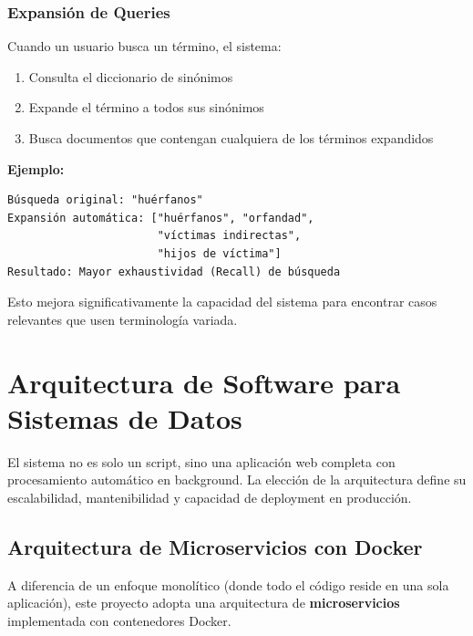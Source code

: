 \subsubsection{Expansión de Queries}
\label{subsubsec:expansion_queries}

Cuando un usuario busca un término, el sistema:
\begin{enumerate}
    \item Consulta el diccionario de sinónimos
    \item Expande el término a todos sus sinónimos
    \item Busca documentos que contengan cualquiera de los términos expandidos
\end{enumerate}

\textbf{Ejemplo:}
\begin{verbatim}
Búsqueda original: "huérfanos"
Expansión automática: ["huérfanos", "orfandad", 
                       "víctimas indirectas", 
                       "hijos de víctima"]
Resultado: Mayor exhaustividad (Recall) de búsqueda
\end{verbatim}

Esto mejora significativamente la capacidad del sistema para encontrar casos relevantes que usen terminología variada.

\section{Arquitectura de Software para Sistemas de Datos}
\label{sec:mt_arquitectura}

El sistema no es solo un script, sino una aplicación web completa con procesamiento automático en background. La elección de la arquitectura define su escalabilidad, mantenibilidad y capacidad de deployment en producción.

\subsection{Arquitectura de Microservicios con Docker}
\label{subsec:microservicios}

A diferencia de un enfoque monolítico (donde todo el código reside en una sola aplicación), este proyecto adopta una arquitectura de \textbf{microservicios} implementada con contenedores Docker.

